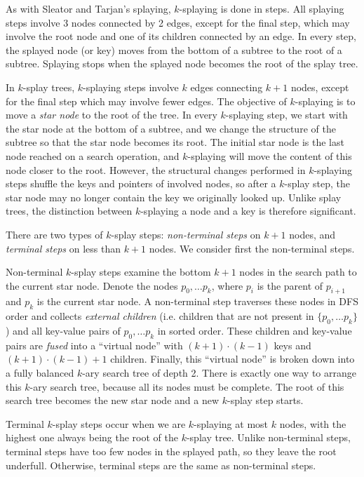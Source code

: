 As with Sleator and Tarjan's splaying, $k$-splaying is done in steps.
All splaying steps involve 3 nodes connected by 2 edges, except for the final
step, which may involve the root node and one of its children connected by
an edge. In every step, the splayed node (or key) moves from the bottom
of a subtree to the root of a subtree. Splaying stops when the splayed node
becomes the root of the splay tree.

In $k$-splay trees, $k$-splaying steps involve $k$ edges connecting
$k+1$ nodes, except for the final step which may involve fewer edges.
The objective of $k$-splaying is to move a \emph{star node} to the
root of the tree. In every $k$-splaying step, we start with the star node
at the bottom of a subtree, and we change the structure of the subtree
so that the star node becomes its root.
The initial star node is the last node reached on a search operation, and
$k$-splaying will move the content of this node closer to the root.
However, the structural changes performed in $k$-splaying steps shuffle
the keys and pointers of involved nodes, so after a $k$-splay step,
the star node may no longer contain the key we originally looked up.
Unlike splay trees, the distinction between $k$-splaying a node and a key
is therefore significant.

There are two types of $k$-splay steps: \emph{non-terminal steps} on
$k+1$ nodes, and \emph{terminal steps} on less than $k+1$ nodes.
We consider first the non-terminal steps.

Non-terminal $k$-splay steps examine the bottom $k+1$ nodes in the search
path to the current star node. Denote the nodes $p_0,\ldots p_{k}$, where $p_i$
is the parent of $p_{i+1}$ and $p_k$ is the current star node. A non-terminal
step traverses these nodes in DFS order and collects \emph{external children}
(i.e. children that are not present in $\{p_0,\ldots p_k\}$) and all key-value
pairs of $p_0,\ldots p_k$ in sorted order. These children and key-value pairs
are \emph{fused} into a ``virtual node'' with $(k+1)\cdot (k-1)$ keys and
$(k+1)\cdot(k-1) + 1$ children. Finally, this ``virtual node'' is broken down
into a fully balanced $k$-ary search tree of depth 2. There is exactly one
way to arrange this $k$-ary search tree, because all its nodes must be complete.
The root of this search tree becomes the new star node and a new $k$-splay
step starts.

Terminal $k$-splay steps occur when we are $k$-splaying at most $k$
nodes, with the highest one always being the root of the $k$-splay tree.
Unlike non-terminal steps, terminal steps have too few nodes in the splayed
path, so they leave the root underfull. Otherwise, terminal steps are the same
as non-terminal steps.

